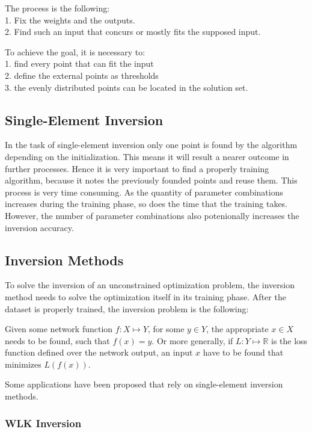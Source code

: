 \noindent The process is the following:\\
1. Fix the weights and the outputs.\\
2. Find such an input that concurs or mostly fits the supposed input. \medskip

\noindent To achieve the goal, it is necessary to:\\
1. find every point that can fit the input\\
2. define the external points as thresholds\\
3. the evenly distributed points can be located in the solution set.



\subsection{Single-Element Inversion}

In the task of single-element inversion only one point is found by the algorithm depending on the initialization. This means it will result a nearer outcome in further processes. Hence it is very important to find a properly training algorithm, because it notes the previously founded points and reuse them. This process is very time consuming. As the quantity of parameter combinations increases during the training phase, so does the time that the training takes. However, the number of parameter combinations also potenionally increases the inversion accuracy.



\subsection{Inversion Methods}

To solve the inversion of an unconstrained optimization problem, the inversion method needs to solve the optimization itself in its training phase. After the dataset is properly trained, the inversion problem is the following:

Given some network function $f : X \mapsto Y$, for some $y \in Y$, the appropriate $x \in X$ needs to be found, such that $f(x) = y$. Or more generally, if $L : Y \mapsto \mathbb{R}$ is the loss function defined over the network output, an input $x$ have to be found that minimizes $L(f(x))$. \smallskip

Some applications have been proposed that rely on single-element inversion methods.


\subsubsection{WLK Inversion}

